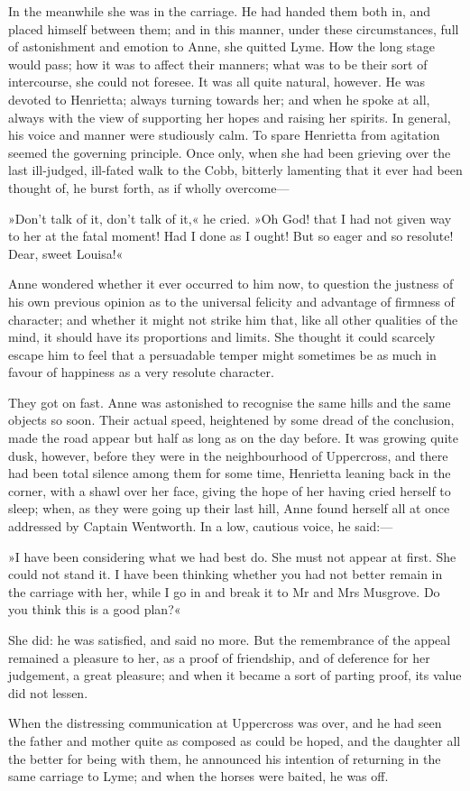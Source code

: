 In the meanwhile she was in the carriage. He had handed them both in, and placed himself between them; and in this manner, under these circumstances, full of astonishment and emotion to Anne, she quitted Lyme. How the long stage would pass; how it was to affect their manners; what was to be their sort of intercourse, she could not foresee. It was all quite natural, however. He was devoted to Henrietta; always turning towards her; and when he spoke at all, always with the view of supporting her hopes and raising her spirits. In general, his voice and manner were studiously calm. To spare Henrietta from agitation seemed the governing principle. Once only, when she had been grieving over the last ill-judged, ill-fated walk to the Cobb, bitterly lamenting that it ever had been thought of, he burst forth, as if wholly overcome—

»Don't talk of it, don't talk of it,« he cried. »Oh God! that I had not given way to her at the fatal moment! Had I done as I ought! But so eager and so resolute! Dear, sweet Louisa!«

Anne wondered whether it ever occurred to him now, to question the justness of his own previous opinion as to the universal felicity and advantage of firmness of character; and whether it might not strike him that, like all other qualities of the mind, it should have its proportions and limits. She thought it could scarcely escape him to feel that a persuadable temper might sometimes be as much in favour of happiness as a very resolute character.

They got on fast. Anne was astonished to recognise the same hills and the same objects so soon. Their actual speed, heightened by some dread of the conclusion, made the road appear but half as long as on the day before. It was growing quite dusk, however, before they were in the neighbourhood of Uppercross, and there had been total silence among them for some time, Henrietta leaning back in the corner, with a shawl over her face, giving the hope of her having cried herself to sleep; when, as they were going up their last hill, Anne found herself all at once addressed by Captain Wentworth. In a low, cautious voice, he said:—

»I have been considering what we had best do. She must not appear at first. She could not stand it. I have been thinking whether you had not better remain in the carriage with her, while I go in and break it to Mr and Mrs Musgrove. Do you think this is a good plan?«

She did: he was satisfied, and said no more. But the remembrance of the appeal remained a pleasure to her, as a proof of friendship, and of deference for her judgement, a great pleasure; and when it became a sort of parting proof, its value did not lessen.

When the distressing communication at Uppercross was over, and he had seen the father and mother quite as composed as could be hoped, and the daughter all the better for being with them, he announced his intention of returning in the same carriage to Lyme; and when the horses were baited, he was off.